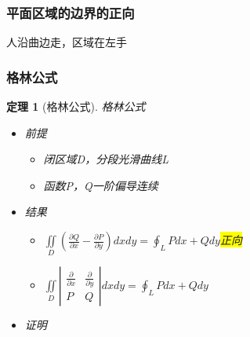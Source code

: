 \documentclass[UTF8,a4paper,12pt,scheme=chinese]{ctexbook}
\newcommand{\ud}{\mathrm{d}}
\newcommand{\hl}[1]{\colorbox{yellow}{#1}}
\newtheorem{theorem}{定理}[section]
\theoremstyle{plain}
\begin{document}
	\subsubsection{平面区域的边界的正向}
	人沿曲边走，区域在左手
	\subsubsection{格林公式}
	\begin{theorem}[格林公式]
		格林公式
		\begin{itemize}
			\item 前提
			\begin{itemize}
				\item 闭区域D，分段光滑曲线L
				\item 函数P，Q一阶偏导连续
			\end{itemize}
			\item 结果
			\begin{itemize}
				\item $\iint\limits_D {(\frac{{\partial Q}}{{\partial x}} - \frac{{\partial P}}{{\partial y}})dxdy} = \oint_L {Pdx + Qdy} $\hl{正向}
				\item $\iint\limits_D {\left| {\begin{array}{*{20}{c}}
						{\frac{\partial }{{\partial x}}}&{\frac{\partial }{{\partial y}}} \\ 
						P&Q 
						\end{array}} \right|}dxdy = \oint_L {Pdx + Qdy} $
			\end{itemize}
			\item 证明
\end{itemize}
\end{theorem}
\end{document}
